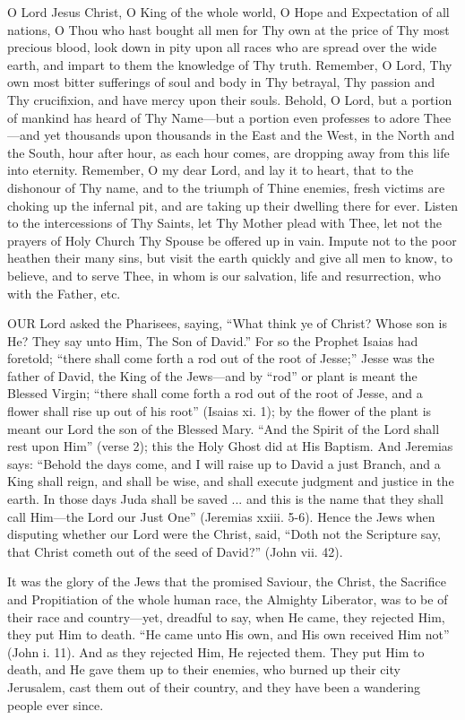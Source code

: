 O Lord Jesus Christ, O King of
the whole world, O Hope and Expectation of all nations, O Thou who hast
bought all men for Thy own at the price of Thy most precious blood, look
down in pity upon all races who are spread over the wide earth, and
impart to them the knowledge of Thy truth. Remember, O Lord, Thy own
most bitter sufferings of soul and body in Thy betrayal, Thy passion and
Thy crucifixion, and have mercy upon their souls. Behold, O Lord,
but a portion of mankind has heard of Thy Name—but a portion even
professes to adore Thee—and yet thousands upon thousands in the East
and the West, in the North and the South, hour after hour, as each hour
comes, are dropping away from this life into eternity. Remember, O my
dear Lord, and lay it to heart, that to the dishonour of Thy name, and
to the triumph of Thine enemies, fresh victims are choking up the
infernal pit, and are taking up their dwelling there for ever. Listen to
the intercessions of Thy Saints, let Thy Mother plead with Thee, let not
the prayers of Holy Church Thy Spouse be offered up in vain. Impute not
to the poor heathen their many sins, but visit the earth quickly and
give all men to know, to believe, and to serve Thee, in whom is our
salvation, life and resurrection, who with the Father, etc.


OUR Lord asked the
Pharisees, saying, ``What think ye of Christ? Whose son is He? They say
unto Him, The Son of David.'' For so the Prophet Isaias had foretold; ``there
shall come forth a rod out of the root of Jesse;'' Jesse was the father
of David, the King of the Jews—and by ``rod'' or plant is meant the
Blessed Virgin; ``there shall come forth a rod out of the root of Jesse,
and a flower shall rise up out of his root'' (Isaias xi. 1); by the
flower of the plant is meant our Lord the son of the Blessed Mary. ``And
the Spirit of the Lord shall rest upon Him'' (verse 2); this the Holy
Ghost did at His Baptism. And Jeremias says: ``Behold the days come, and
I will raise up to David a just Branch, and a King shall reign, and
shall be wise, and shall execute judgment and justice in the earth. In
those days Juda shall be saved ... and this is the name that they shall
call Him—the Lord our Just One'' (Jeremias xxiii. 5-6). Hence the Jews
when disputing whether our Lord were the Christ, said, ``Doth not the
Scripture say, that Christ cometh out of the seed of David?'' (John vii.
42).

It was the glory of the Jews
that the promised Saviour, the Christ, the Sacrifice and Propitiation of
the whole human race, the Almighty Liberator, was to be of their race
and country—yet, dreadful to say, when He came, they rejected
Him, they put Him to death. ``He came unto His own, and His own received
Him not'' (John i. 11). And as they rejected Him, He rejected them. They
put Him to death, and He gave them up to their enemies, who burned up
their city Jerusalem, cast them out of their country, and they have been
a wandering people ever since.

